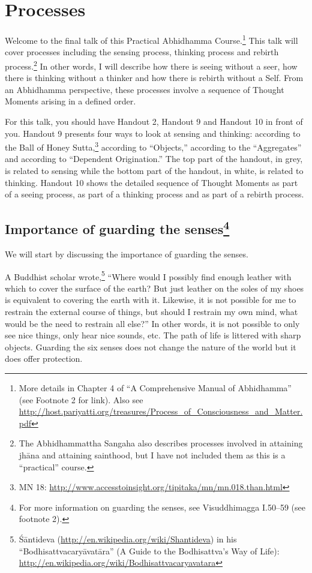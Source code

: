 \section{Processes}

Welcome to the final talk of this Practical Abhidhamma Course.\footnote{More details in Chapter 4 of “A Comprehensive Manual of Abhidhamma” (see Footnote 2 for link). \newline Also see \url{http://host.pariyatti.org/treasures/Process_of_Consciousness_and_Matter.pdf}} This talk will cover processes including the sensing process, thinking process and rebirth process.\footnote{The Abhidhammattha Sangaha also describes processes involved in attaining jhāna and attaining sainthood, but I have not included them as this is a “practical” course.} In other words, I will describe how there is seeing without a seer, how there is thinking without a thinker and how there is rebirth without a Self. From an Abhidhamma perspective, these processes involve a sequence of Thought Moments arising in a defined order.

For this talk, you should have Handout 2, Handout 9 and Handout 10 in front of you. Handout 9 presents four ways to look at sensing and thinking: according to the Ball of Honey Sutta,\footnote{MN 18: \url{http://www.accesstoinsight.org/tipitaka/mn/mn.018.than.html}} according to “Objects,” according to the “Aggregates” and according to “Dependent Origination.” The top part of the handout, in grey, is related to sensing while the bottom part of the handout, in white, is related to thinking. Handout 10 shows the detailed sequence of Thought Moments as part of a seeing process, as part of a thinking process and as part of a rebirth process.

\subsection*{Importance of guarding the senses\footnote{For more information on guarding the senses, see Visuddhimagga I.50--59 (see footnote 2).}}

We will start by discussing the importance of guarding the senses.

A Buddhist scholar wrote,\footnote{Śāntideva (\url{http://en.wikipedia.org/wiki/Shantideva}) in his “Bodhisattvacaryāvatāra” (A Guide to the Bodhisattva’s Way of Life): \url{http://en.wikipedia.org/wiki/Bodhisattvacaryavatara}} “Where would I possibly find enough leather with which to cover the surface of the earth? But just leather on the soles of my shoes is equivalent to covering the earth with it. Likewise, it is not possible for me to restrain the external course of things, but should I restrain my own mind, what would be the need to restrain all else?” In other words, it is not possible to only see nice things, only hear nice sounds, etc. The path of life is littered with sharp objects. Guarding the six senses does not change the nature of the world but it does offer protection.

